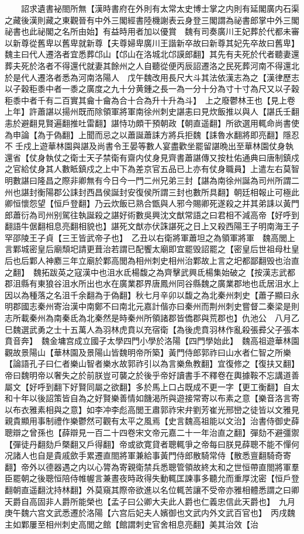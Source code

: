 　　詔求遺書袐閤所無【漢時書府在外則有太常太史博士掌之内則有延閣廣内石渠之藏後漢則藏之東觀晉有中外三閣經書陸機謝表云身登三閣謂為祕書郎掌中外三閣祕書也此祕閣之名所由始】有益時用者加以優賞　魏有司奏廣川王妃葬於代都未審以新尊從舊卑以舊卑就新尊【夫尊婦卑廣川王諧新卒故曰新尊其妃先卒故曰舊卑】魏主曰代人遷洛者宜悉葬邙山【邙山在洛城北邙謨郎翻】其先有夫死於代者聽妻還葬夫死於洛者不得還代就妻其餘州之人自聽從便丙辰詔遷洛之民死葬河南不得還北於是代人遷洛者悉為河南洛陽人　戊午魏改用長尺大斗其法依漢志為之【漢律歷志以子穀秬黍中者一黍之廣度之九十分黄鍾之長一為一分十分為寸十寸為尺又以子穀秬黍中者千有二百實其龠十龠為合十合為升十升為斗】　上之廢鬱林王也【見上卷上年】許蕭諶以揚州既而除領軍將軍南徐州刺史諶恚曰見炊飯推以與人【諶氏壬翻恚於避翻見賢遍翻推吐雷翻】諶恃功頗干預朝政【朝直遥翻】所欲選用輒命尚書使為申論【為于偽翻】上聞而忌之以蕭誕蕭誄方將兵拒魏【誄魯水翻將即亮翻】隱忍不壬戍上遊華林園與諶及尚書令王晏等數人宴盡歡坐罷留諶晩出至華林園仗身執還省【仗身執仗之衛士天子禁衛有齋内仗身見齊書蕭諶傳又按杜佑通典曰唐制鎮戍之官給仗身其人數眡鎮戍之上中下為差京官五品已上亦有仗身職員】上遣左右莫智明數諶曰隆昌之際非卿無有今日今一門二州兄弟三封【諶為南徐州誕為司州所謂二州也諶封衡陽郡公誄封西昌侯誕封安復侯所謂三封也數所具翻】朝廷相報止可極此卿恒懷怨望【恒戶登翻】乃云炊飯已熟合甑與人邪今賜卿死遂殺之并其弟誄以黃門郎蕭衍為司州别駕往執誕殺之諶好術數吳興沈文猷常語之曰君相不減高帝【好呼到翻語牛倨翻相息亮翻相貌也】諶死文猷亦伏誅諶死之日上又殺西陽王子明南海王子罕邵陵王子貞【三王皆武帝子也】　乙丑以右衛將軍蕭坦之為領軍將軍　魏高閭上言鄴城密皇后廟頹圯請更葺治若謂已配饗太廟即宜罷毁詔罷之【密皇后世祖母杜皇后也后鄴人神䴥三年立廟於鄴高閭為相州刺史相州治鄴故上言之圯都鄙翻毁也治直之翻】　魏拓跋英之寇漢中也沮水氐楊馥之為齊擊武興氐楊集始破之【按漢志武都郡沮縣有東狼谷沮水所出也水在廣業郡界唐鳳州同谷縣魏之廣業郡地也氐居沮水上因以為種落之名沮千余翻為于偽翻】秋七月辛卯以馥之為北秦州刺史【蕭子顯曰永明郡國志秦州寄治漢中南鄭不曰南北元嘉計偕亦曰秦州而荆州刺史嘗督二秦梁是則志所載秦州為南秦氐為北秦然是時秦州所領諸郡皆僑郡與荒郡也】仇池公　八月乙巳魏選武勇之士十五萬人為羽林虎賁以充宿衛【為後虎賁羽林作亂殺張彛父子張本賁音奔】　魏金墉宫成立國子太學四門小學於洛陽【四門學始此】　魏高祖遊華林園觀故景陽山【華林園及景陽山皆魏明帝所築】黃門侍郎郭祚曰山水者仁智之所樂【論語孔子曰仁者樂山智者樂水故郭祚引以為言樂魚教翻】宜復修之【復扶又翻】帝曰魏明帝以奢失之於前朕豈可襲之於後乎帝好讀書手不釋卷在輿據鞍不忘講道善屬文【好呼到翻下好賢同屬之欲翻】多於馬上口占既成不更一字【更工衡翻】自太和十年以後詔策皆自為之好賢樂善情如饑渴所與遊接常寄以布素之意【樂音洛言寄以布衣雅素相與之意】如李冲李彪高閭王肅郭祚宋弁劉芳崔光邢巒之徒皆以文雅見親貴顯用事制禮作樂鬱然可觀有太平之風焉【史言魏高祖能以文治】治書侍御史薛聰辯之曾孫也【薛辯見一百二十四卷宋文帝元嘉二十一年治直之翻】彈劾不避彊禦【彈徒丹翻劾戶槩翻又戶得翻】帝或欲寛貸者聰輒爭之帝每曰朕見薛聰不能不憚何况諸人也自是貴戚歛手累遷直閤將軍兼給事黃門侍郎散騎常侍【散悉亶翻騎奇寄翻】帝外以德器遇之内以心膂為寄親衛禁兵悉聰管領故終太和之世恒帶直閤將軍羣臣罷朝之後聰恒陪侍帷幄言兼晝夜時政得失動輒匡諫事多聽允而重厚沈密【恒戶登翻朝直遥翻沈持林翻】外莫窺其際帝欲進以名位輒苦讓不受帝亦雅相體悉謂之曰卿天爵自高固非人爵所能榮也【孟子曰公卿大夫此人爵也仁義忠信此天爵也】　九月庚午魏六宫文武悉遷於洛陽【六宫后妃夫人嬪御也文武内外文武百官也】　丙戌魏主如鄴屢至相州刺史高閭之館【館謂刺史官舍相息亮翻】美其治效【治